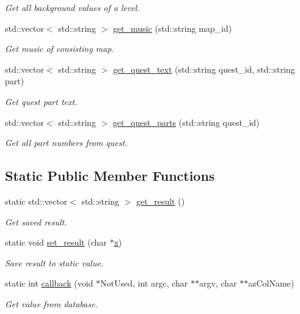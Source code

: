 \begin{DoxyCompactItemize}
\begin{DoxyCompactList}\small\item\em Get all background values of a level. \end{DoxyCompactList}\item 
std\+::vector$<$ std\+::string $>$ \hyperlink{classsql_ae959c21f71c8f9b1df8bde932a6c484b}{get\+\_\+music} (std\+::string map\+\_\+id)
\begin{DoxyCompactList}\small\item\em Get music of consisting map. \end{DoxyCompactList}\item 
std\+::vector$<$ std\+::string $>$ \hyperlink{classsql_a59249e218b1bb9d811c50b5615312eaf}{get\+\_\+quest\+\_\+text} (std\+::string quest\+\_\+id, std\+::string part)
\begin{DoxyCompactList}\small\item\em Get quest part text. \end{DoxyCompactList}\item 
std\+::vector$<$ std\+::string $>$ \hyperlink{classsql_a9f75a32a77a498b1a328a53ade518ce7}{get\+\_\+quest\+\_\+parts} (std\+::string quest\+\_\+id)
\begin{DoxyCompactList}\small\item\em Get all part numbers from quest. \end{DoxyCompactList}\end{DoxyCompactItemize}
\subsection*{Static Public Member Functions}
\begin{DoxyCompactItemize}
\item 
static std\+::vector$<$ std\+::string $>$ \hyperlink{classsql_ad4d8bdf41eede1ae1363d0be8a2f60a9}{get\+\_\+result} ()
\begin{DoxyCompactList}\small\item\em Get saved result. \end{DoxyCompactList}\item 
static void \hyperlink{classsql_ad28cc81f2ee03c6a15d26ff216353d71}{set\+\_\+result} (char $\ast$\hyperlink{button__actions_8hpp_ad0da36b2558901e21e7a30f6c227a45e}{x})
\begin{DoxyCompactList}\small\item\em Save result to static value. \end{DoxyCompactList}\item 
static int \hyperlink{classsql_aff61710f28dd54827b67a99c24fbdb0d}{callback} (void $\ast$Not\+Used, int argc, char $\ast$$\ast$argv, char $\ast$$\ast$az\+Col\+Name)
\begin{DoxyCompactList}\small\item\em Get value from database. \end{DoxyCompactList}\end{DoxyCompactItemize}
